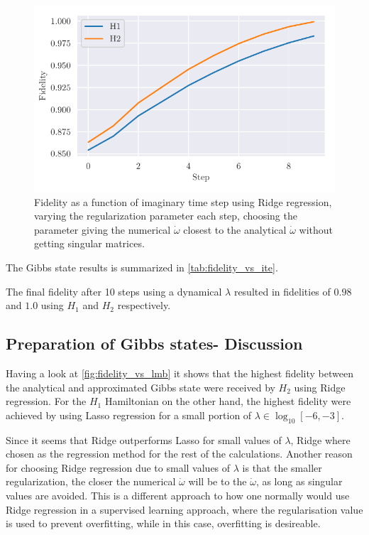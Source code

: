 \documentclass[../main.tex]{subfiles}
\begin{document}
\begin{figure}[h]
    \begin{center}
        \includegraphics{figures/Fidelity_dynamic_lmb_without_rz_new.pdf}
        \caption{Fidelity as a function of imaginary time step using Ridge regression, varying the regularization parameter each step, choosing the parameter giving the numerical $\Dot{\omega}$ closest to the analytical $\Dot{\omega}$ without getting singular matrices.}
        \label{fig:fidelity_lambda_log_increament}
    \end{center}
\end{figure}

The Gibbs state results is summarized in \autoref{tab:fidelity_vs_ite}.

The final fidelity after 10 steps using a dynamical $\lambda$ resulted in fidelities of $0.98$ and $1.0$ using $H_1$ and $H_2$ respectively. 

\FloatBarrier
\subsection{Preparation of Gibbs states- Discussion}
Having a look at \autoref{fig:fidelity_vs_lmb} it shows that the highest fidelity between the analytical and approximated Gibbs state were received by $H_2$ using Ridge regression. For the $H_1$ Hamiltonian on the other hand, the highest fidelity were achieved by using Lasso regression for a small portion of $\lambda \in \log_{10}[-6,-3]$.

Since it seems that Ridge outperforms Lasso for small values of $\lambda$, Ridge where chosen as the regression method for the rest of the calculations. Another reason for choosing Ridge regression due to small values of $\lambda$ is that the smaller regularization, the closer the numerical $\Dot{\omega}$ will be to the $\Dot{\omega}$, as long as singular values are avoided. This is a different approach to how one normally would use Ridge regression in a supervised learning approach, where the regularisation value is used to prevent overfitting, while in this case, overfitting is desireable.
\end{document}
